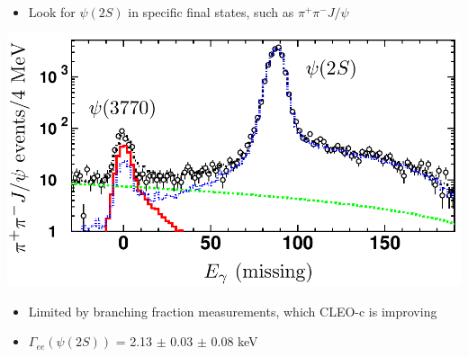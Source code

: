 \documentclass[landscape]{article}
\newenvironment{slide}[1][ ]{\mbox{\bf \boldmath #1 } \vfill}{\vfill \vspace{-1.5 cm} \mbox{ } \pagebreak}
\newenvironment{itemizer}[1]{\begin{itemize}\setlength{\itemsep}{#1}}{\end{itemize}}
\begin{document}
\begin{slide}

\begin{itemize}

  \item Look for $\psi(2S)$ in specific final states, such as $\pi^+\pi^- J/\psi$

\end{itemize}

\vfill

\begin{center}
  \includegraphics[width=0.8\linewidth]{psi_gamee2}
\end{center}

\vfill

\begin{itemizer}{0.5 cm}

  \item Limited by branching fraction measurements, which CLEO-c is improving

  \item $\Gamma_{ee}(\psi(2S))$ = 2.13 $\pm$ 0.03 $\pm$ 0.08 keV

\end{itemizer}

\end{slide}
\end{document}
